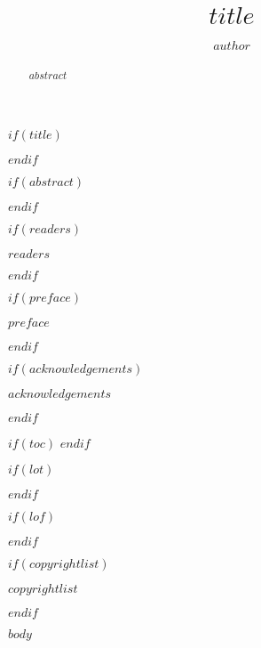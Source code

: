 \documentclass[11pt,a4paper,titlepage,twoside,openright]{style/unimelbthesis}
\title{$title$}
\author{$author$}
\begin{document}
\begin{frontmatter}


$if(title)$
  \maketitle
$endif$


$if(abstract)$
  \begin{abstract}
    $abstract$
  \end{abstract}
$endif$


$if(readers)$
  \begin{readers}
    $readers$
  \end{readers}
$endif$


$if(preface)$
  \begin{preface}
    $preface$
  \end{preface}
$endif$


$if(acknowledgements)$
  \begin{acknowledgements}
    $acknowledgements$
  \end{acknowledgements}
$endif$


$if(toc)$
  \hypersetup{linkcolor=$if(toccolor)$$toccolor$$else$black$endif$}
  \setcounter{tocdepth}{$toc-depth$}
  \tableofcontents
$endif$


$if(lot)$
  \listoftables
$endif$


$if(lof)$
  \listoffigures
$endif$


$if(copyrightlist)$
\begin{copyrightlist}
  $copyrightlist$
\end{copyrightlist}
$endif$

\end{frontmatter}

%


\begin{mainmatter}

$body$

\end{mainmatter}
\end{document}
